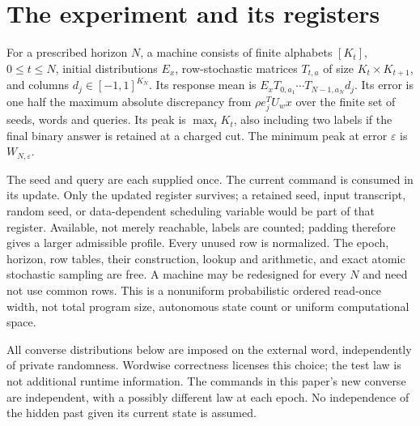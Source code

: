 \section{The experiment and its registers}\label{sec:model}
\begin{definition}\label{def:machine}
For a prescribed horizon $N$, a machine consists of finite alphabets
$[K_t]$, $0\le t\le N$, initial distributions $E_x$, row-stochastic
matrices $T_{t,a}$ of size $K_t\times K_{t+1}$, and columns
$d_j\in[-1,1]^{K_N}$. Its response mean is
$E_xT_{0,a_1}\cdots T_{N-1,a_N}d_j$. Its error is one half the maximum
absolute discrepancy from $\rho e_j^TU_wx$ over the finite set of seeds,
words and queries. Its peak is $\max_tK_t$, also including two labels
if the final binary answer is retained at a charged cut. The minimum
peak at error $\varepsilon$ is $W_{N,\varepsilon}$.
\end{definition}

The seed and query are each supplied once. The current command is consumed
in its update. Only the updated register survives; a retained seed,
input transcript, random seed, or data-dependent scheduling variable
would be part of that register. Available, not merely reachable, labels
are counted; padding therefore gives a larger admissible profile. Every
unused row is normalized. The epoch, horizon, row tables, their construction,
lookup and arithmetic, and exact atomic stochastic sampling are free.
A machine may be redesigned for every $N$ and need not use common rows.
This is a nonuniform probabilistic ordered read-once width, not total
program size, autonomous state count or uniform computational space.

All converse distributions below are imposed on the external word,
independently of private randomness. Wordwise correctness licenses this
choice; the test law is not additional runtime information. The commands
in this paper's new converse are independent, with a possibly different
law at each epoch. No independence of the hidden past given its current
state is assumed.

